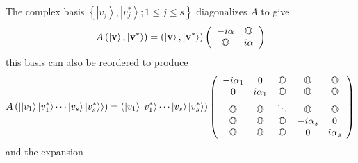 The complex basis $\left\{ \left\vert v_{j}\right\rangle ,\left\vert
v_{j}^{\ast }\right\rangle ;1\leq j\leq s\right\} $ diagonalizes $A$ to give 
\begin{equation}
A\left( \left\vert {\bf v}\right\rangle ,\left\vert {\bf v}^{\ast
}\right\rangle \right) =\left( \left\vert {\bf v}\right\rangle ,\left\vert 
{\bf v}^{\ast }\right\rangle \right) \left( 
\begin{array}{cc}
-i{\bf \alpha } & {\Bbb O} \\ 
{\Bbb O} & i{\bf \alpha }%
\end{array}%
\right)
\end{equation}%
this basis can also be reordered to produce 
\begin{equation}
A\left( \left\vert \left\vert v_{1}\right\rangle \left\vert v_{1}^{\ast
}\right\rangle \cdots \left\vert v_{s}\right\rangle \left\vert v_{s}^{\ast
}\right\rangle \right\rangle \right) =\left( \left\vert v_{1}\right\rangle
\left\vert v_{1}^{\ast }\right\rangle \cdots \left\vert v_{s}\right\rangle
\left\vert v_{s}^{\ast }\right\rangle \right) \left( 
\begin{array}{ccccc}
-i\alpha _{1} & 0 & {\Bbb O} & {\Bbb O} & {\Bbb O} \\ 
0 & i\alpha _{1} & {\Bbb O} & {\Bbb O} & {\Bbb O} \\ 
{\Bbb O} & {\Bbb O} & \ddots & {\Bbb O} & {\Bbb O} \\ 
{\Bbb O} & {\Bbb O} & {\Bbb O} & -i\alpha _{s} & 0 \\ 
{\Bbb O} & {\Bbb O} & {\Bbb O} & 0 & i\alpha _{s}%
\end{array}%
\right)
\end{equation}%
and the expansion%
